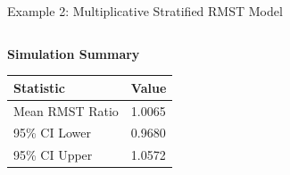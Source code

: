 \documentclass{beamer}
\begin{document}
\begin{frame}[fragile]{Example 2: Multiplicative Stratified RMST Model}
\begin{columns}[T,onlytextwidth]
\begin{column}{0.4\textwidth}
    \vspace{0.4em}
    \footnotesize
    \textbf{Simulation Summary}

    \vspace{0.25em}
    \begin{tabular}{@{}ll@{}}
      \toprule
      Statistic        & Value \\
      \midrule
      Mean RMST Ratio  & 1.0065 \\
      95\% CI Lower    & 0.9680 \\
      95\% CI Upper    & 1.0572 \\
      \bottomrule
    \end{tabular}
  \end{column}
\end{columns}
\end{frame}
\end{document}
